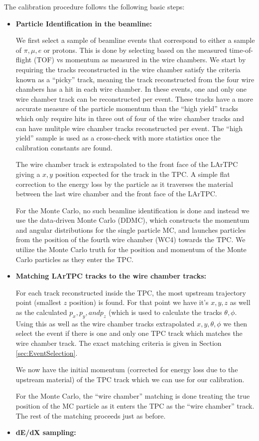 The calibration procedure follows the following basic steps:
\begin{itemize}

\item \textbf{Particle Identification in the beamline:}

We first select a sample of beamline events that correspond to either a sample of $\pi, \mu, e$ or protons. This is done by selecting based on the measured time-of-flight (TOF) vs momentum as measured in the wire chambers. We start by requiring the tracks reconstructed in the wire chamber satisfy the criteria known as a ``picky'' track, meaning the track reconstructed from the four wire chambers has a hit in each wire chamber. In these events, one and only one wire chamber track can be reconstructed per event. These tracks have a more accurate measure of the particle momentum than the ``high yield'' tracks which only require hits in three out of four of the wire chamber tracks and can have mulitple wire chamber tracks reconstructed per event. The ``high yield'' sample is used as a cross-check with more statistics once the calibration constants are found.

The wire chamber track is extrapolated to the front face of the LArTPC giving a $x, y$ position expected for the track in the TPC. A simple flat correction to the energy loss by the particle as it traverses the material between the last wire chamber and the front face of the LArTPC.

For the Monte Carlo, no such beamline identification is done and instead we use the data-driven Monte Carlo (DDMC), which constructs the momentum and angular distributions for the single particle MC, and launches particles from the position of the fourth wire chamber (WC4) towards the TPC. We utilize the Monte Carlo truth for the position and momentum of the Monte Carlo particles as they enter the TPC.

\item \textbf{Matching LArTPC tracks to the wire chamber tracks:}

For each track reconstructed inside the TPC, the most upstream trajectory point (smallest $z$ position) is found. For that point we have it's $x, y, z$ as well as the calculated $p_{x}, p_{y}, and p_{z}$ (which is used to calculate the tracks $\theta, \phi$. Using this as well as the wire chamber tracks extrapolated $x, y, \theta, \phi$ we then select the event if there is one and only one TPC track which matches the wire chamber track. The exact matching criteria is given in Section \ref{sec:EventSelection}.

We now have the initial momentum (corrected for energy loss due to the upstream material) of the TPC track which we can use for our calibration.

For the Monte Carlo, the ``wire chamber'' matching is done treating the true position of the MC particle as it enters the TPC as the ``wire chamber'' track. The rest of the matching proceeds just as before.

\item \textbf{dE/dX sampling:}



\end{itemize}